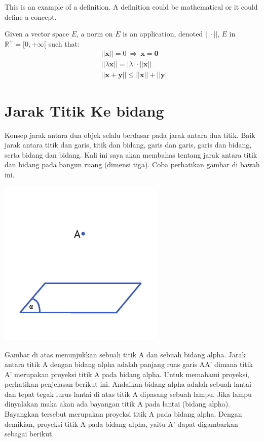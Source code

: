 \documentclass[11pt,fleqn]{book} %
\begin{document}
This is an example of a definition. A definition could be mathematical or it could define a concept.

\begin{definition}
Given a vector space $E$, a norm on $E$ is an application, denoted $||\cdot||$, $E$ in $\mathbb{R}^+=[0,+\infty[$ such that:
\begin{align}
& ||\mathbf{x}||=0\ \Rightarrow\ \mathbf{x}=\mathbf{0}\\
& ||\lambda \mathbf{x}||=|\lambda|\cdot ||\mathbf{x}||\\
& ||\mathbf{x}+\mathbf{y}||\leq ||\mathbf{x}||+||\mathbf{y}||
\end{align}
\end{definition}

\section{Jarak Titik Ke bidang}

	Konsep jarak antara dua objek selalu berdasar pada jarak antara dua titik. Baik jarak antara titik dan garis, titik dan bidang, garis dan garis, garis dan bidang, serta bidang dan bidang. Kali ini saya akan membahas tentang jarak antara titik dan bidang pada bangun ruang (dimensi tiga). Coba perhatikan gambar di bawah ini.


\includegraphics[width = 8cm, height= 8cm]{Pictures/dede1.jpg}

	Gambar di atas menunjukkan sebuah titik A dan sebuah bidang alpha. Jarak antara titik A dengan bidang alpha adalah panjang ruas garis AA' dimana titik A' merupakan proyeksi titik A pada bidang alpha. Untuk memahami proyeksi, perhatikan penjelasan berikut ini.
	Andaikan bidang alpha adalah sebuah lantai dan tepat tegak lurus lantai di atas titik A dipasang sebuah lampu. Jika lampu dinyalakan maka akan ada bayangan titik A pada lantai (bidang alpha). Bayangkan tersebut merupakan proyeksi titik A pada bidang alpha. Dengan demikian, proyeksi titik A pada bidang alpha, yaitu A' dapat digambarkan sebagai berikut.
\end{document}
